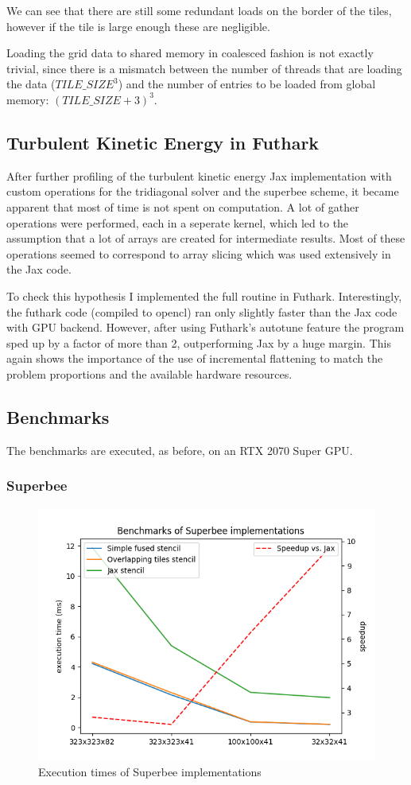 \documentclass[a4paper,oneside]{memoir}
\begin{document}
We can see that there are still some redundant loads on the border of the tiles, however if the tile is large enough these are negligible. 

Loading the grid data to shared memory in coalesced fashion is not exactly trivial, since there is a mismatch between the number of threads that are loading the data ($TILE\_SIZE^3$) and the number of entries to be loaded from global memory: $(TILE\_SIZE+3)^3$.

\subsection{Turbulent Kinetic Energy in Futhark}
After further profiling of the turbulent kinetic energy Jax implementation with custom operations for the tridiagonal solver and the superbee scheme, it became apparent that most of time is not spent on computation. A lot of gather operations were performed, each in a seperate kernel, which led to the assumption that a lot of arrays are created for intermediate results. Most of these operations seemed to correspond to array slicing which was used extensively in the Jax code.

To check this hypothesis I implemented the full routine in Futhark. 
Interestingly, the futhark code (compiled to opencl) ran only slightly faster than the Jax code with GPU backend. However, after using Futhark's autotune feature the program sped up by a factor of more than 2, outperforming Jax by a huge margin. This again shows the importance of the use of incremental flattening to match the problem proportions and the available hardware resources.


\subsection{Benchmarks}
The benchmarks are executed, as before, on an RTX 2070 Super GPU.
\subsubsection{Superbee}
\begin{figure}[h]
    \centering
    \includegraphics[width=\textwidth]{timings_superbee.png}
    \caption{Execution times of Superbee implementations}
    \label{fig:superbee_bench}
\end{figure}
\end{document}
